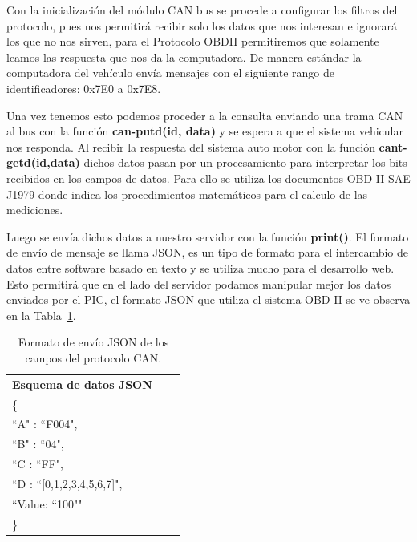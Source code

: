 Con la inicialización del módulo CAN bus se procede a configurar los filtros del protocolo, pues nos permitirá recibir solo los datos que nos interesan e ignorará los que no nos sirven, para el Protocolo OBDII permitiremos que solamente leamos las respuesta que nos da la computadora. 
De manera estándar la computadora del vehículo envía mensajes con el siguiente rango de identificadores: 0x7E0 a 0x7E8. 

Una vez tenemos esto podemos proceder a la consulta enviando una trama CAN al bus con la función {\bfseries can-putd(id, data)} y se espera a que el sistema vehicular nos responda. 
Al recibir la respuesta del sistema auto motor con la función {\bfseries cant-getd(id,data)} dichos datos pasan por un procesamiento para interpretar los bits recibidos en los campos de datos. 
Para ello se utiliza los documentos OBD-II SAE J1979 donde indica los procedimientos matemáticos para el calculo de las mediciones. 

Luego se envía dichos datos a nuestro servidor con la función {\bfseries print()}. 
El formato de envío de mensaje se llama JSON, es un tipo de formato para el intercambio de datos entre software basado en texto y se utiliza mucho para el desarrollo web. 
Esto permitirá que en el lado del servidor podamos manipular mejor los datos enviados por el PIC, el formato JSON que utiliza el sistema OBD-II se ve observa en la Tabla~\ref{tabla:jsoncan}. 


\begin{table}[H]
\begin{center}
\begin{tabular}{l c c  }
\toprule
\textbf{Esquema de datos JSON}  & &   \\ 

\{            &  &    \\   
  ``A" : ``F004",  &  &  \\
  ``B" :  ``04",   &  &   \\  
  ``C : ``FF",    &  &   \\  
  ``D : ``[0,1,2,3,4,5,6,7]", & &  \\ ``Value: ``100""  &  &  \\    
  \}          &  & \\ \bottomrule
\end{tabular}
\caption{Formato de envío JSON de los campos del protocolo CAN.}
\label{tabla:jsoncan}
\end{center}
\end{table}


